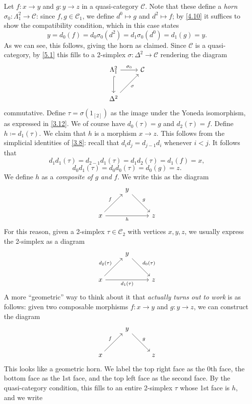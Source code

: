 Let $f : x \to y$ and $g : y \to z$ in a quasi-category $\mathcal{C} $. Note that these define a \emph{horn} $\sigma _0 : \Lambda _1^2 \to \mathcal{C} $: since $f,g\in \mathcal{C} _1$, we define $d^0 \mapsto g$ and $d^2 \mapsto f$; by \cref{4.10} it suffices to show the compatibility condition, which in this case states
\[
	y = d_0(f)=d_0\sigma _0(d^2) = d_1\sigma _0(d^0)=d_1(g)=y
.\]
As we can see, this follows, giving the horn as claimed. Since $\mathcal{C} $ is a quasi-category, by \cref{5.1} this fills to a 2-simplex $\sigma : \Delta ^2 \to \mathcal{C} $ rendering the diagram
\[\begin{tikzcd}[row sep = 2.5em, column sep = 2.5em]
\Lambda _1^2 \ar[" \sigma _0 ", r] \ar[hook, d]  & \mathcal{C}  \\
\Delta ^2 \ar[" \sigma  "', ur]  & 
\end{tikzcd}\]
commutative. Define $\tau =\sigma (1_{[2]} )$ as the image under the Yoneda isomorphism, as expressed in \cref{3.12}. We of course have $d_0(\tau )=g$ and $d_2(\tau )=f$. Define $h\coloneqq d_1(\tau )$. We claim that $h$ is a morphism $x\to z$. This follows from the simplicial identities of \cref{3.8}: recall that $d_id_j=d_{j-1} d_i$ whenever $i<j$. It follows that
\[
	d_1d_1(\tau )=d_{2-1} d_1(\tau )=d_1d_2(\tau )=d_1(f)=x,
\]
\[
	d_0d_1(\tau )=d_0d_0(\tau )=d_0(g)=z
.\]
We define $h$ as a \emph{composite of $g$ and $f$}. We write this as the diagram
\[\begin{tikzcd}[row sep = 2.5em, column sep = 2.5em]
 & y \ar[" g ", dr]  &  \\
x \ar[" f ", ur] \ar[" h "', rr]  &  & z
\end{tikzcd}\]
For this reason, given a 2-simplex $\tau \in \mathcal{C}_2$ with vertices $x,y,z$, we usually express the 2-simplex as a diagram
\[\begin{tikzcd}[row sep = 2.5em, column sep = 2.5em]
 & y \ar[" d_0(\tau ) ", dr]  &  \\
x \ar[" d_2(\tau ) ", ur] \ar[" d_1(\tau ) "', rr]  &  & z
\end{tikzcd}\]
A more ``geometric'' way to think about it that \emph{actually turns out to work} is as follows: given two composable morphisms $f : x \to y$ and $g : y \to z$, we can construct the diagram
\[\begin{tikzcd}[row sep = 2.5em, column sep = 2.5em]
 & y\ar[" g ", dr]  &  \\
x\ar[" f ", ur]  &  & z
\end{tikzcd}\]
This looks like a geometric horn. We label the top right face as the 0th face, the bottom face as the 1st face, and the top left face as the second face. By the quasi-category condition, this fills to an entire 2-simplex $\tau $ whose 1st face is $h$, and we write
